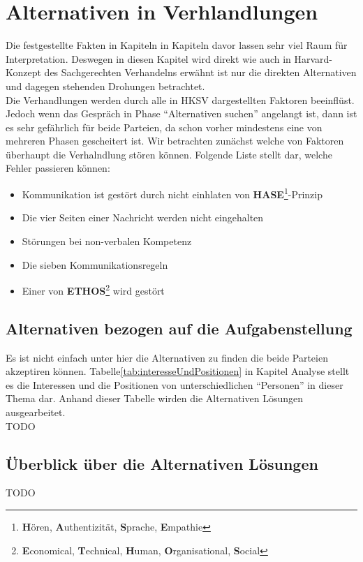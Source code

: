 \chapter{Alternativen in Verhlandlungen}
Die festgestellte Fakten in Kapiteln in Kapiteln davor lassen sehr viel Raum für Interpretation. Deswegen in diesen Kapitel wird direkt wie auch in
Harvard-Konzept des Sachgerechten Verhandelns\cite{hk} erwähnt ist nur die direkten Alternativen und dagegen stehenden Drohungen betrachtet.\\
Die Verhandlungen werden durch alle in HKSV dargestellten Faktoren beeinflüst. Jedoch wenn das Gespräch in Phase "`Alternativen suchen"' angelangt
ist, dann ist es sehr gefährlich für beide Parteien, da schon vorher mindestens eine von mehreren Phasen gescheitert ist. Wir betrachten zunächst
welche von Faktoren überhaupt die Verhalndlung stören können. Folgende Liste stellt dar, welche Fehler passieren können:
\begin{itemize}
  \item Kommunikation ist gestört durch nicht einhlaten von \textbf{HASE}\footnote{\textbf{H}ören, \textbf{A}uthentizität, \textbf{S}prache,
  \textbf{E}mpathie}\cite{nk}-Prinzip
  \item Die vier Seiten einer Nachricht werden nicht eingehalten
  \item Störungen bei non-verbalen Kompetenz
  \item Die sieben Kommunikationsregeln\cite{nk}
  \item Einer von \textbf{ETHOS}\footnote{\textbf{E}conomical, \textbf{T}echnical, \textbf{H}uman, \textbf{O}rganisational, \textbf{S}ocial}\cite{nk}
  wird gestört
\end{itemize}
\section{Alternativen bezogen auf die Aufgabenstellung}
Es ist nicht einfach unter hier die Alternativen zu finden die beide Parteien akzeptiren können. Tabelle\ref{tab:interesseUndPositionen} in Kapitel
Analyse stellt es die Interessen und die Positionen von unterschiedlichen "`Personen"' in dieser Thema dar. Anhand dieser Tabelle wirden die
Alternativen Lösungen ausgearbeitet. \\

TODO 

\section{Überblick über die Alternativen Lösungen}

TODO